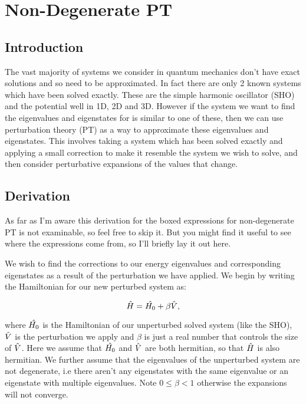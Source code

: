 \chapter{Non-Degenerate PT}
\label{chapt1}

\section{Introduction}

The vast majority of systems we consider in quantum mechanics don't have exact solutions and so need to be approximated. In fact there are only 2 known systems which have been solved exactly. These are the simple harmonic oscillator (SHO) and the potential well in 1D, 2D and 3D. However if the system we want to find the eigenvalues and eigenstates for is similar to one of these, then we can use perturbation theory (PT) as a way to approximate these eigenvalues and eigenstates. This involves taking a system which has been solved exactly and applying a small correction to make it resemble the system we wish to solve, and then consider perturbative expansions of the values that change.

\section{Derivation}

\noindent As far as I'm aware this derivation for the boxed expressions for non-degenerate PT is not examinable, so feel free to skip it. But you might find it useful to see where the expressions come from, so I'll briefly lay it out here.

\noindent We wish to find the corrections to our energy eigenvalues and corresponding eigenstates as a result of the perturbation we have applied. We begin by writing the Hamiltonian for our new perturbed system as:

\begin{equation}
    \Hat{H} = \Hat{H_0} + \beta \Hat{V},
    \label{ModifidedHamiltonianPT}
\end{equation}

\noindent where $\Hat{H_0}$ is the Hamiltonian of our unperturbed solved system (like the SHO), $\Hat{V}$ is the perturbation we apply and $\beta$ is just a real number that controls the size of $\Hat{V}$. Here we assume that $\Hat{H_0}$ and $\Hat{V}$ are both hermitian, so that $\Hat{H}$ is also hermitian. We further assume that the eigenvalues of the unperturbed system are not degenerate, i.e there aren't any eigenstates with the same eigenvalue or an eigenstate with multiple eigenvalues. Note $0\leq \beta < 1$ otherwise the expansions will not converge.

